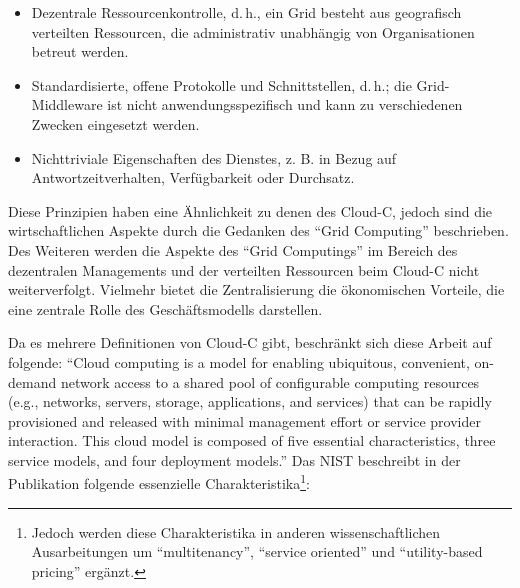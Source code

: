 \begin{itemize}
	\item Dezentrale Ressourcenkontrolle, d.\,h., ein Grid besteht aus geografisch verteilten Ressourcen, die administrativ unabhängig von Organisationen betreut werden.	
	\item Standardisierte, offene Protokolle und Schnittstellen, d.\,h.; die Grid-Middleware
	ist nicht anwendungsspezifisch und kann zu verschiedenen Zwecken eingesetzt
	werden.
	\item Nichttriviale Eigenschaften des Dienstes, z. B. in Bezug auf Antwortzeitverhalten, Verfügbarkeit oder Durchsatz.
\end{itemize}
Diese Prinzipien haben eine Ähnlichkeit zu denen des \ac{Cloud-C}, jedoch sind die wirtschaftlichen Aspekte durch die Gedanken des \enquote{Grid Computing} beschrieben. Des Weiteren werden die Aspekte des \enquote{Grid Computings} im Bereich des dezentralen Managements und der verteilten Ressourcen beim \ac{Cloud-C} nicht weiterverfolgt. Vielmehr bietet die Zentralisierung die ökonomischen Vorteile, die eine zentrale Rolle des Geschäftsmodells darstellen. \par
Da es mehrere Definitionen von \ac{Cloud-C} gibt, beschränkt sich diese Arbeit auf folgende: \enquote{Cloud computing is a model for enabling ubiquitous, convenient, on-demand network access to a shared pool of configurable computing resources (e.g., networks, servers, storage, applications, and services) that can be rapidly provisioned and released with minimal management effort or service provider interaction. This cloud model is composed of five essential characteristics, three service models, and four deployment models.}\autocite[][S.\,2]{mell_nist_2011} Das \ac{NIST} beschreibt in der Publikation \cite{mell_nist_2011} folgende essenzielle Charakteristika\footnote{Jedoch werden diese Charakteristika in anderen wissenschaftlichen Ausarbeitungen um \enquote{multitenancy}, \enquote{service oriented} und \enquote{utility-based pricing} ergänzt.\autocite[vgl.][S.\,1]{institute_of_electrical_and_electronics_engineers_cloud_2011}}: 


